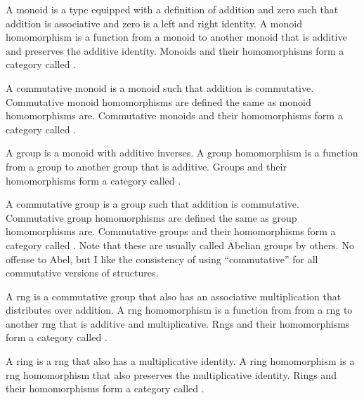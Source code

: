 \documentclass[../../math.tex]{subfiles}
\begin{document}
\begin{definition}
    A monoid is a type equipped with a definition of addition and zero such that
    addition is associative and zero is a left and right identity.  A monoid
    homomorphism is a function from a monoid to another monoid that is additive
    and preserves the additive identity.  Monoids and their homomorphisms form a
    category called .
\end{definition}

\begin{definition}
    A commutative monoid is a monoid such that addition is commutative.
    Commutative monoid homomorphisms are defined the same as monoid
    homomorphisms are.  Commutative monoids and their homomorphisms form a
    category called .
\end{definition}

\begin{definition}
    A group is a monoid with additive inverses.  A group homomorphism is a
    function from a group to another group that is additive.  Groups and their
    homomorphisms form a category called .
\end{definition}

\begin{definition}
    A commutative group is a group such that addition is commutative.
    Commutative group homomorphisms are defined the same as group homomorphisms
    are.  Commutative groups and their homomorphisms form a category called
    .  Note that these are usually called Abelian groups by others.
    No offense to Abel, but I like the consistency of using ``commutative'' for
    all commutative versions of structures.
\end{definition}

\begin{definition}
    A rng is a commutative group that also has an associative multiplication
    that distributes over addition.  A rng homomorphism is a function from from
    a rng to another rng that is additive and multiplicative.  Rngs and their
    homomorphisms form a category called .
\end{definition}

\begin{definition}
    A ring is a rng that also has a multiplicative identity.  A ring
    homomorphism is a rng homomorphism that also preserves the multiplicative
    identity.  Rings and their homomorphisms form a category called .
\end{definition}
\end{document}

